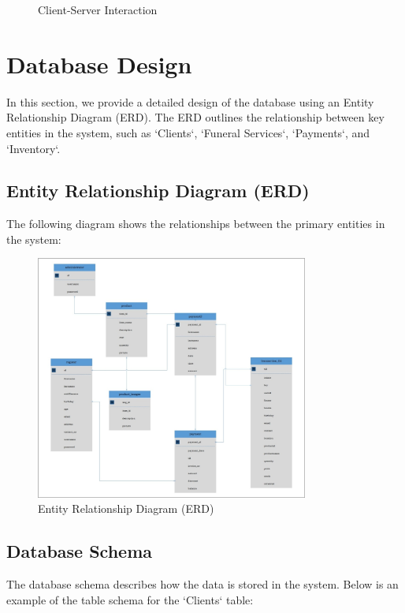 \documentclass[a4paper,12pt]{report}
\begin{document}
\begin{figure}[ht]
\begin{minipage}{0.45\textwidth}
    \caption{Client-Server Interaction}
    \label{fig:system_architecture_2}
\end{minipage}
\end{figure}

\section{Database Design}
In this section, we provide a detailed design of the database using an Entity Relationship Diagram (ERD). The ERD outlines the relationship between key entities in the system, such as `Clients`, `Funeral Services`, `Payments`, and `Inventory`.

\subsection{Entity Relationship Diagram (ERD)}
The following diagram shows the relationships between the primary entities in the system:

\begin{figure}[ht]
\centering
\includegraphics[width=0.8\textwidth]{../img/erd.png}
\caption{Entity Relationship Diagram (ERD)}
\label{fig:erd}
\end{figure}

\subsection{Database Schema}
The database schema describes how the data is stored in the system. Below is an example of the table schema for the `Clients` table:
\end{document}
